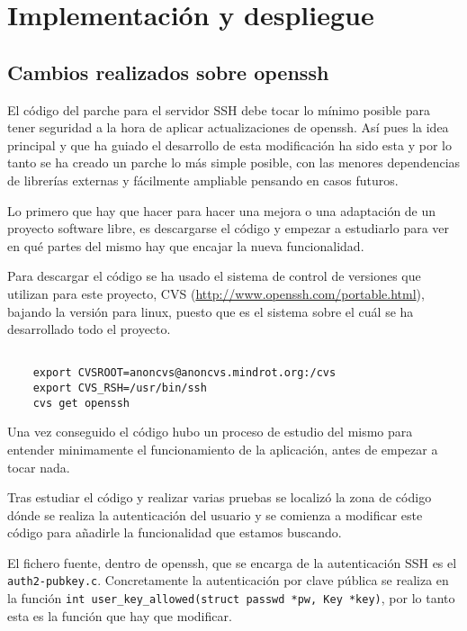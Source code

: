 
\chapter{Implementación y despliegue}
    \label{implementacion}
    \section{Cambios realizados sobre openssh}

    El código del parche para el servidor SSH debe tocar lo mínimo
    posible para tener seguridad a la hora de aplicar actualizaciones
    de openssh. Así pues la idea principal y que ha guiado el
    desarrollo de esta modificación ha sido esta y por lo tanto se ha
    creado un parche lo más simple posible, con las menores
    dependencias de librerías externas y fácilmente ampliable
    pensando en casos futuros.

    Lo primero que hay que hacer para hacer una mejora o una adaptación de
    un proyecto software libre, es descargarse el código y empezar a
    estudiarlo para ver en qué partes del mismo hay que encajar la nueva
    funcionalidad.

    Para descargar el código se ha usado el sistema de control de versiones
    que utilizan para este proyecto, CVS
    (\url{http://www.openssh.com/portable.html}), bajando la versión para
    linux, puesto que es el sistema sobre el cuál se ha desarrollado todo
    el proyecto.
    
    \begin{verbatim}

    export CVSROOT=anoncvs@anoncvs.mindrot.org:/cvs
    export CVS_RSH=/usr/bin/ssh
    cvs get openssh

    \end{verbatim}

    Una vez conseguido el código hubo un proceso de estudio del mismo
    para entender minimamente el funcionamiento de la aplicación, antes de
    empezar a tocar nada.

    Tras estudiar el código y realizar varias pruebas se localizó la zona
    de código dónde se realiza la autenticación del usuario y se comienza
    a modificar este código para añadirle la funcionalidad que estamos
    buscando.

    El fichero fuente, dentro de openssh, que se encarga de la
    autenticación SSH es el \texttt{auth2-pubkey.c}. Concretamente la
    autenticación por clave pública se realiza en la función
    \texttt{int user\_key\_allowed(struct passwd *pw, Key *key)}, por lo
    tanto esta es la función que hay que modificar.

